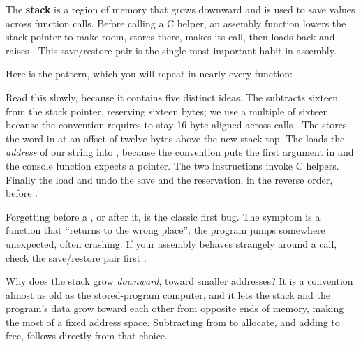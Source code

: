 \begin{prgconcept}
The \textbf{stack} is a region of memory that grows downward and is used to save
values across function calls. Before calling a C helper, an assembly function
lowers the stack pointer  to make room, stores  there, makes its
call, then loads  back and raises . This save/restore pair is the
single most important habit in \riscv assembly.
\end{prgconcept}

Here is the pattern, which you will repeat in nearly every function:




Read this slowly, because it contains five distinct ideas. The  subtracts sixteen from the stack pointer, reserving sixteen bytes; we use a
multiple of sixteen because the convention requires  to stay 16-byte
aligned across calls \citep{prg32abi}. The  stores the word in
 at an offset of twelve bytes above the new stack top. The  loads the \emph{address} of our string into , because the
convention puts the first argument in  and the console function expects a
pointer. The two  instructions invoke C helpers. Finally the load and
 undo the save and the reservation, in the reverse order, before
.

\begin{prgwarn}
Forgetting  before a , or  after it, is the
classic first bug. The symptom is a function that ``returns to the wrong place'':
the program jumps somewhere unexpected, often crashing. If your assembly behaves
strangely around a call, check the  save/restore pair first
\citep{prg32tutorialascii}.
\end{prgwarn}

\begin{prgaside}
Why does the stack grow \emph{downward}, toward smaller addresses? It is a
convention almost as old as the stored-program computer, and it lets the stack
and the program's data grow toward each other from opposite ends of memory,
making the most of a fixed address space. Subtracting from  to allocate,
and adding to free, follows directly from that choice.
\end{prgaside}

